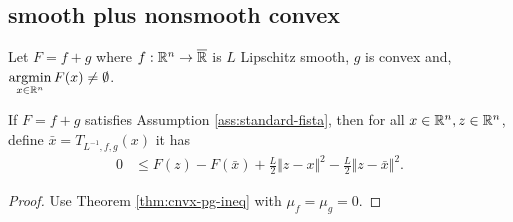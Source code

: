 \documentclass[12pt]{report}
\begin{document}
        \subsection{smooth plus nonsmooth convex}
            \begin{assumption}\label{ass:standard-fista}
                Let $F = f + g$ where $f:\mathbb R^n\rightarrow \overline {\mathbb R}$ is $L$ Lipschitz smooth, $g$ is convex and, $\mathop{\rm argmin}\limits_{x \in \mathbb R^n} F(x)\neq \emptyset$.
            \end{assumption}
            \begin{lemma}\label{lemma:fitsa-pg-ineq}
                If $F = f + g$ satisfies Assumption \ref{ass:standard-fista}, then for all $x \in \mathbb R^n, z \in \mathbb R^n$, define $\bar x = T_{L^{-1}, f, g}(x)$ it has 
                \begin{align*}
                    0 &\le F(z) - F(\bar x) + \frac{L}{2}\Vert z - x\Vert^2 - \frac{L}{2}\Vert z - \bar x\Vert^2. 
                \end{align*}
            \end{lemma}
            \begin{proof}
                Use Theorem \ref{thm:cnvx-pg-ineq} with $\mu_f = \mu_g = 0$. 
            \end{proof}
            
\end{document}
